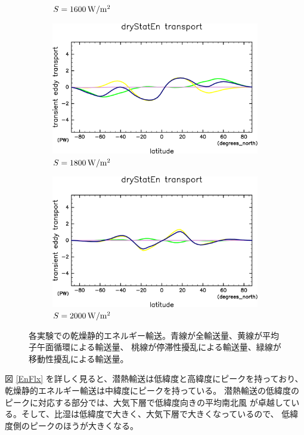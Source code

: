 \documentclass[body]{subfiles}
\begin{document}
\begin{figure}[t]
\begin{subfigure}{.4\textwidth}
		\caption{\(S=1600\hmu{W/m^2}\)}
	\end{subfigure}
	\begin{subfigure}{.4\textwidth}
		\centering
		\includegraphics[width=\columnwidth]{S1800/MeriHeatTrans@dryStatEn,time=3650:4015-crop-rotate.pdf}
		\caption{\(S=1800\hmu{W/m^2}\)}
	\end{subfigure}
	\begin{subfigure}{.4\textwidth}
		\centering
		\includegraphics[width=\columnwidth]{S2000/MeriHeatTrans@dryStatEn,time=7300:7665-crop-rotate.pdf}
		\caption{\(S=2000\hmu{W/m^2}\)}
	\end{subfigure}
	\caption[各実験での乾燥静的エネルギー輸送]{
		各実験での乾燥静的エネルギー輸送。青線が全輸送量、黄線が平均子午面循環による輸送量、
		桃線が停滞性擾乱による輸送量、緑線が移動性擾乱による輸送量。
	}\label{乾燥静的エネルギー}
\end{figure}


図 \ref{EnFlx} を詳しく見ると、潜熱輸送は低緯度と高緯度にピークを持っており、
乾燥静的エネルギー輸送は中緯度にピークを持っている。
潜熱輸送の低緯度のピークに対応する部分では、大気下層で低緯度向きの平均南北風
が卓越している。そして、比湿は低緯度で大きく、大気下層で大きくなっているので、
低緯度側のピークのほうが大きくなる。
\end{document}
